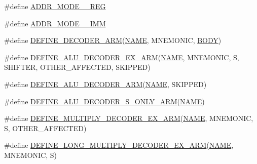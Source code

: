 \begin{DoxyCompactItemize}
\item 
\#define \mbox{\hyperlink{decoder-arm_8c_a20938819535c2aad9bcabce8d0cd392e}{A\+D\+D\+R\+\_\+\+M\+O\+D\+E\+\_\+\_\+\+R\+EG}}
\item 
\#define \mbox{\hyperlink{decoder-arm_8c_a321c7a001ccca870aa3fa7f2e50835ec}{A\+D\+D\+R\+\_\+\+M\+O\+D\+E\+\_\+\_\+\+I\+MM}}
\item 
\#define \mbox{\hyperlink{decoder-arm_8c_a4fe6e4683fda92c7774b0678f5ab95cc}{D\+E\+F\+I\+N\+E\+\_\+\+D\+E\+C\+O\+D\+E\+R\+\_\+\+A\+RM}}(\mbox{\hyperlink{inflate_8h_a164ea0159d5f0b5f12a646f25f99eceaa67bc2ced260a8e43805d2480a785d312}{N\+A\+ME}},  M\+N\+E\+M\+O\+N\+IC,  \mbox{\hyperlink{gzlog_8c_aa6bdf6a6d9916c343e1e17774d84a156}{B\+O\+DY}})
\item 
\#define \mbox{\hyperlink{decoder-arm_8c_a9f65c06daece247752b5fd0285e475f3}{D\+E\+F\+I\+N\+E\+\_\+\+A\+L\+U\+\_\+\+D\+E\+C\+O\+D\+E\+R\+\_\+\+E\+X\+\_\+\+A\+RM}}(\mbox{\hyperlink{inflate_8h_a164ea0159d5f0b5f12a646f25f99eceaa67bc2ced260a8e43805d2480a785d312}{N\+A\+ME}},  M\+N\+E\+M\+O\+N\+IC,  S,  S\+H\+I\+F\+T\+ER,  O\+T\+H\+E\+R\+\_\+\+A\+F\+F\+E\+C\+T\+ED,  S\+K\+I\+P\+P\+ED)
\item 
\#define \mbox{\hyperlink{decoder-arm_8c_a4a46c1e899448a2f81ee8daec776f5f3}{D\+E\+F\+I\+N\+E\+\_\+\+A\+L\+U\+\_\+\+D\+E\+C\+O\+D\+E\+R\+\_\+\+A\+RM}}(\mbox{\hyperlink{inflate_8h_a164ea0159d5f0b5f12a646f25f99eceaa67bc2ced260a8e43805d2480a785d312}{N\+A\+ME}},  S\+K\+I\+P\+P\+ED)
\item 
\#define \mbox{\hyperlink{decoder-arm_8c_a70c90343c0e681e30b66003504112865}{D\+E\+F\+I\+N\+E\+\_\+\+A\+L\+U\+\_\+\+D\+E\+C\+O\+D\+E\+R\+\_\+\+S\+\_\+\+O\+N\+L\+Y\+\_\+\+A\+RM}}(\mbox{\hyperlink{inflate_8h_a164ea0159d5f0b5f12a646f25f99eceaa67bc2ced260a8e43805d2480a785d312}{N\+A\+ME}})
\item 
\#define \mbox{\hyperlink{decoder-arm_8c_afc2ae0e71cbb57e26b7bc46758f2d130}{D\+E\+F\+I\+N\+E\+\_\+\+M\+U\+L\+T\+I\+P\+L\+Y\+\_\+\+D\+E\+C\+O\+D\+E\+R\+\_\+\+E\+X\+\_\+\+A\+RM}}(\mbox{\hyperlink{inflate_8h_a164ea0159d5f0b5f12a646f25f99eceaa67bc2ced260a8e43805d2480a785d312}{N\+A\+ME}},  M\+N\+E\+M\+O\+N\+IC,  S,  O\+T\+H\+E\+R\+\_\+\+A\+F\+F\+E\+C\+T\+ED)
\item 
\#define \mbox{\hyperlink{decoder-arm_8c_af06f7d9feea3af0dff0fd68d50b8fb0c}{D\+E\+F\+I\+N\+E\+\_\+\+L\+O\+N\+G\+\_\+\+M\+U\+L\+T\+I\+P\+L\+Y\+\_\+\+D\+E\+C\+O\+D\+E\+R\+\_\+\+E\+X\+\_\+\+A\+RM}}(\mbox{\hyperlink{inflate_8h_a164ea0159d5f0b5f12a646f25f99eceaa67bc2ced260a8e43805d2480a785d312}{N\+A\+ME}},  M\+N\+E\+M\+O\+N\+IC,  S)

\end{DoxyCompactItemize}
